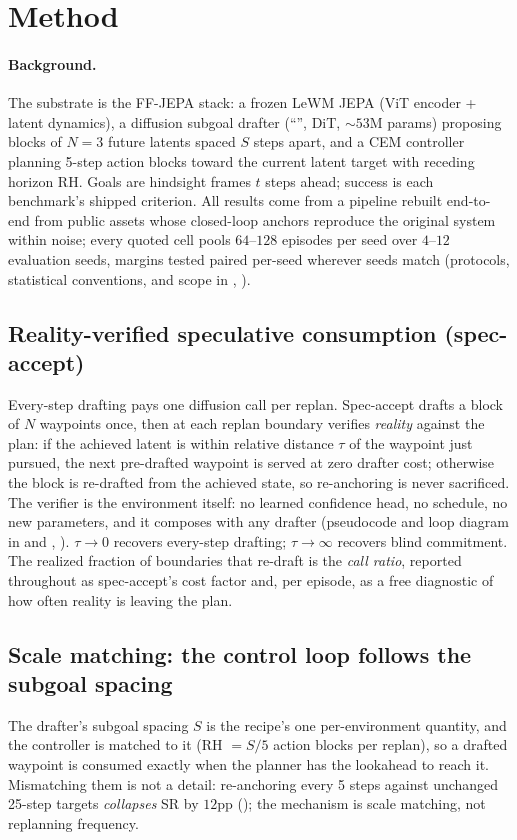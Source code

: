 \documentclass{article}
\newcommand{\gdm}{\text{GDM}}
\begin{document}
\section{Method}
\label{sec:method}
\label{sec:setup}
\paragraph{Background.}
The substrate is the FF-JEPA stack: a frozen LeWM JEPA (ViT encoder + latent
dynamics), a diffusion subgoal drafter (``\gdm{}'', DiT, ${\sim}53$M params)
proposing blocks of $N{=}3$ future latents spaced $S$ steps apart, and a CEM
controller planning 5-step action blocks toward the current latent target with
receding horizon RH. Goals are hindsight frames $t$ steps ahead; success is
each benchmark's shipped criterion. All results come from a pipeline rebuilt
end-to-end from public assets whose closed-loop anchors reproduce the original
system within noise; every quoted cell pools $64$--$128$ episodes per seed
over $4$--$12$ evaluation seeds, margins tested paired per-seed wherever seeds
match (protocols, statistical conventions, and scope in ,
).

\subsection{Reality-verified speculative consumption (spec-accept)}
\label{sec:method-spec}
Every-step drafting pays one diffusion call per replan. Spec-accept drafts a block of
$N$ waypoints once, then at each replan boundary verifies \emph{reality} against the
plan: if the achieved latent is within relative distance $\tau$ of the waypoint
just pursued, the next pre-drafted waypoint is served at zero drafter cost;
otherwise the block is re-drafted from the achieved state, so re-anchoring is
never sacrificed. The verifier is the
environment itself: no learned confidence head, no schedule, no new parameters, and it
composes with any drafter (pseudocode and loop diagram in 
and , ).
$\tau{\to}0$ recovers every-step drafting; $\tau{\to}\infty$ recovers blind
commitment. The realized fraction of boundaries that re-draft is the
\emph{call ratio}, reported throughout as spec-accept's cost factor and, per
episode, as a free diagnostic of how often reality is leaving the plan.

\subsection{Scale matching: the control loop follows the subgoal spacing}
\label{sec:method-scale}
The drafter's subgoal spacing $S$ is the recipe's one per-environment quantity,
and the controller is matched to it (RH $= S/5$ action blocks per replan), so a
drafted waypoint is consumed exactly when the planner has the lookahead to
reach it. Mismatching them is not a detail: re-anchoring every 5 steps against
unchanged 25-step targets \emph{collapses} SR by $12$pp ();
the mechanism is scale matching, not replanning frequency.
\end{document}
